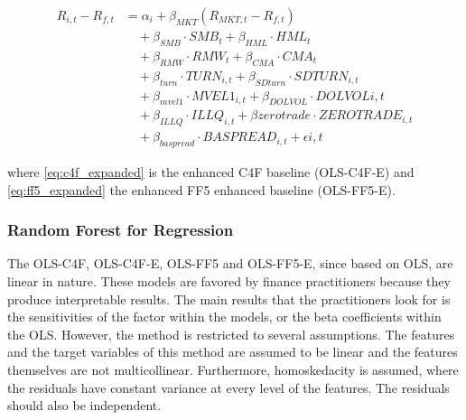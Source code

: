 \begin{equation}
    \label{eq:ff5_expanded}
    \begin{split}
    R_{i,t} - R_{f,t} &= \alpha_i + \beta_{MKT} (R_{MKT,t} - R_{f,t}) \\
    &\quad + \beta_{SMB} \cdot SMB_t + \beta_{HML} \cdot HML_t \\
    &\quad + \beta_{RMW} \cdot RMW_t + \beta_{CMA} \cdot CMA_t\\
    &\quad + \beta_{turn} \cdot TURN_{i,t} + \beta_{SDturn} \cdot SDTURN_{i,t} \\
    &\quad + \beta_{mvel1} \cdot MVEL1_{i,t} + \beta_{DOLVOL} \cdot DOLVOL{i,t} \\
    &\quad + \beta_{ILLQ} \cdot ILLQ_{i,t} + \beta{zerotrade} \cdot ZEROTRADE_{i,t} \\
    &\quad + \beta_{baspread} \cdot BASPREAD_{i,t} + \epsilon{i,t}
    \end{split}
\end{equation}

where \cref{eq:c4f_expanded} is the enhanced C4F baseline (OLS-C4F-E) and \cref{eq:ff5_expanded} the enhanced FF5 enhanced baseline (OLS-FF5-E).



\subsubsection{Random Forest for Regression}



The OLS-C4F, OLS-C4F-E, OLS-FF5 and OLS-FF5-E, since based on OLS, are linear in nature. These models are favored by finance practitioners because they produce interpretable results. The main results that the practitioners look for is the sensitivities of the factor within the models, or the beta coefficients within the OLS. However, the method is restricted to several assumptions. The features and the target variables of this method are assumed to be linear and the features themselves are not multicollinear. Furthermore, homoskedacity is assumed, where the residuals have constant variance at every level of the features. The residuals should also be independent.


